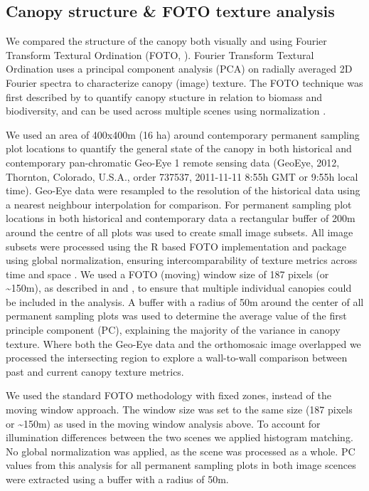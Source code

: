 \documentclass[remote sensing,article,submit,moreauthors,pdftex,10pt,a4paper]{mdpi}
\begin{document}
\hypertarget{canopy-structure-foto-texture-analysis}{%
\subsection{Canopy structure \& FOTO texture
analysis}\label{canopy-structure-foto-texture-analysis}}

We compared the structure of the canopy both visually and using Fourier
Transform Textural Ordination (FOTO, \citet{couteron2002}). Fourier
Transform Textural Ordination uses a principal component analysis (PCA)
on radially averaged 2D Fourier spectra to characterize canopy (image)
texture. The FOTO technique was first described by \citet{couteron2002}
to quantify canopy stucture in relation to biomass and biodiversity, and
can be used across multiple scenes using normalization
\citep{Barbier2010}.

We used an area of 400x400m (16 ha) around contemporary permanent
sampling plot locations to quantify the general state of the canopy in
both historical and contemporary pan-chromatic Geo-Eye 1 remote sensing
data (GeoEye, 2012, Thornton, Colorado, U.S.A., order 737537, 2011-11-11
8:55h GMT or 9:55h local time). Geo-Eye data were resampled to the
resolution of the historical data using a nearest neighbour
interpolation for comparison. For permanent sampling plot locations in
both historical and contemporary data a rectangular buffer of 200m
around the centre of all plots was used to create small image subsets.
All image subsets were processed using the R based FOTO implementation
and package \citep{hufkens2019a} using global normalization, ensuring
intercomparability of texture metrics across time and space
\citep{Barbier2010}. We used a FOTO (moving) window size of 187 pixels
(or \textasciitilde{}150m), as described in \citet{solorzano2018} and
\citet{Barbier2010}, to ensure that multiple individual canopies could
be included in the analysis. A buffer with a radius of 50m around the
center of all permanent sampling plots was used to determine the average
value of the first principle component (PC), explaining the majority of
the variance in canopy texture. Where both the Geo-Eye data and the
orthomosaic image overlapped we processed the intersecting region to
explore a wall-to-wall comparison between past and current canopy
texture metrics.

We used the standard FOTO methodology with fixed zones, instead of the
moving window approach. The window size was set to the same size (187
pixels or \textasciitilde{}150m) as used in the moving window analysis
above. To account for illumination differences between the two scenes we
applied histogram matching. No global normalization was applied, as the
scene was processed as a whole. PC values from this analysis for all
permanent sampling plots in both image scences were extracted using a
buffer with a radius of 50m.
\end{document}
